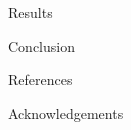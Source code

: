 \documentclass[final]{beamer}
\newlength{\onecolwid}
\begin{document}
\begin{frame}[t]
\begin{columns}[t]
\begin{column}{\onecolwid}
\begin{block}{Results}
\end{block}



\begin{block}{Conclusion}

\end{block}



\begin{block}{References}

\nocite{*} %
\small{
\vspace{0.75in}}

\end{block}



\begin{block}{Acknowledgements}


\end{block}





\end{column}
\end{columns}
\end{frame}
\end{document}
